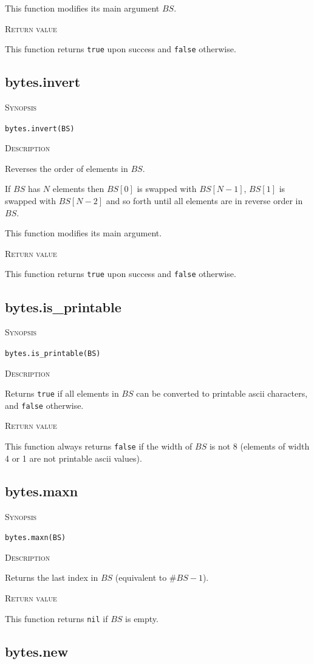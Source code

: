 \documentclass[11pt]{report}
\newcommand{\mansection}[1]{\vspace{0.5em}\par\noindent\textsc{#1}\vspace{0.5em}\par}
\begin{document}
  This function modifies its main argument $BS$.
  
\mansection{Return value}
  This function returns \texttt{true} upon success and \texttt{false} otherwise.

\subsection{bytes.invert}

\mansection{Synopsis}
\texttt{bytes.invert(BS)}

\mansection{Description}
  Reverses the order of elements in $BS$.

  If $BS$ has $N$ elements then $BS[0]$ is swapped with $BS[N-1]$,
  $BS[1]$ is swapped with $BS[N-2]$ and so forth until all elements are
  in reverse order in $BS$.

  This function modifies its main argument.
\mansection{Return value}
  This function returns \texttt{true} upon success and \texttt{false} otherwise.


\subsection{bytes.is\_printable}

\mansection{Synopsis}
\texttt{bytes.is\_printable(BS)}

\mansection{Description}
  Returns \texttt{true} if all elements in $BS$ can be converted to 
  printable ascii characters, and \texttt{false} otherwise.

\mansection{Return value}
  This function always returns \texttt{false} if the width of $BS$ is 
  not 8 (elements of width 4 or 1 are not printable ascii values).  


\subsection{bytes.maxn}

\mansection{Synopsis}
\texttt{bytes.maxn(BS)}

\mansection{Description}
  Returns the last index in $BS$ (equivalent to $\#BS-1$).
\mansection{Return value}
  This function returns \texttt{nil} if $BS$ is empty.


\subsection{bytes.new}
\end{document}
